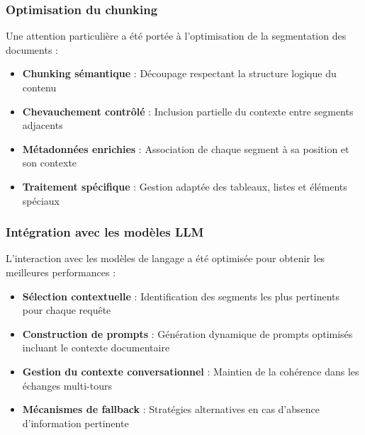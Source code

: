 \subsubsection{Optimisation du chunking}

Une attention particulière a été portée à l'optimisation de la segmentation des documents :

\begin{itemize}
  \item \textbf{Chunking sémantique} : Découpage respectant la structure logique du contenu
  
  \item \textbf{Chevauchement contrôlé} : Inclusion partielle du contexte entre segments adjacents
  
  \item \textbf{Métadonnées enrichies} : Association de chaque segment à sa position et son contexte
  
  \item \textbf{Traitement spécifique} : Gestion adaptée des tableaux, listes et éléments spéciaux
\end{itemize}

\subsubsection{Intégration avec les modèles LLM}

L'interaction avec les modèles de langage a été optimisée pour obtenir les meilleures performances :

\begin{itemize}
  \item \textbf{Sélection contextuelle} : Identification des segments les plus pertinents pour chaque requête
  
  \item \textbf{Construction de prompts} : Génération dynamique de prompts optimisés incluant le contexte documentaire
  
  \item \textbf{Gestion du contexte conversationnel} : Maintien de la cohérence dans les échanges multi-tours
  
  \item \textbf{Mécanismes de fallback} : Stratégies alternatives en cas d'absence d'information pertinente
\end{itemize}

